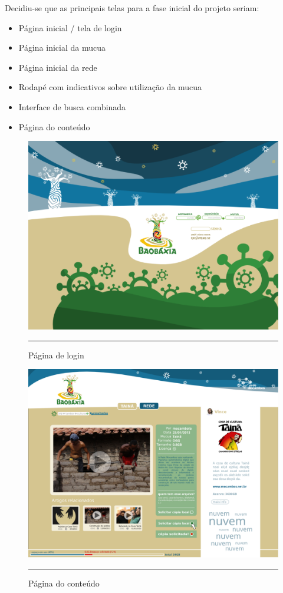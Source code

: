 Decidiu-se que as principais telas para a fase inicial do projeto seriam:
\begin{itemize}
  \item Página inicial / tela de login
  \item Página inicial da mucua
  \item Página inicial da rede
  \item Rodapé com indicativos sobre utilização da mucua
  \item Interface de busca combinada
  \item Página do conteúdo
\end{itemize}

\begin{figure}[htbp]
  \centering
  \includegraphics[width=\textwidth]{./Fig/layout-login.pdf}
  \rule{35em}{0.5pt}
  \caption[Página de login]{Página de login}
  \label{fig:layout-login}
\end{figure}

\begin{figure}[htbp]
  \centering
  \includegraphics[width=\textwidth]{./Fig/layout-pgCONTEUDO.pdf}
  \rule{35em}{0.5pt}
  \caption[Página do conteúdo]{Página do conteúdo}
  \label{fig:layout-pgCONTEUDO}
\end{figure}

